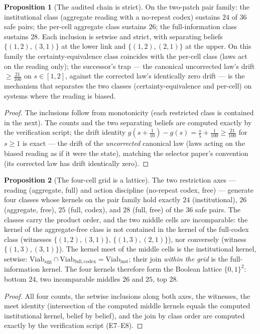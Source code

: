 \documentclass[10pt,twocolumn]{article}
\theoremstyle{definition}
\newtheorem{proposition}{Proposition}
\begin{document}
\begin{proposition}[The audited chain is strict]
\label{prop:chain}
On the two-patch pair family: the institutional class (aggregate reading
with a no-repeat codex) sustains $24$ of $36$ safe pairs; the per-cell
aggregate class sustains $26$; the full-information class sustains $28$.
Each inclusion is setwise and strict, with separating beliefs
$\{(1,2),(3,1)\}$ at the lower link and $\{(1,2),(2,1)\}$ at the upper.
On this family the certainty-equivalence class coincides with the
per-cell class (laws act on the reading only); the successor's trap ---
the canonical uncorrected law's drift $\ge\tfrac{21}{100}$ on
$s\in[1,2]$, against the corrected law's identically zero drift --- is
the mechanism that separates the two classes (certainty-equivalence and
per-cell) on systems where the reading is biased.
\end{proposition}
\begin{proof}
The inclusions follow from monotonicity (each restricted class is contained
in the next). The counts and the two separating beliefs are computed
exactly by the verification script; the drift identity
$g(s+\tfrac1{10})-g(s)=\tfrac s5+\tfrac1{100}\ge\tfrac{21}{100}$ for
$s\ge1$ is exact --- the drift of the \emph{uncorrected} canonical law
(laws acting on the biased reading as if it were the state), matching the
selector paper's convention (its corrected law has drift identically zero).
\end{proof}

\begin{proposition}[The four-cell grid is a lattice]
\label{prop:grid}
The two restriction axes --- reading (aggregate, full) and action
discipline (no-repeat codex, free) --- generate four classes whose kernels
on the pair family hold exactly $24$ (institutional), $26$ (aggregate,
free), $25$ (full, codex), and $28$ (full, free) of the $36$ safe pairs.
The classes carry the product order, and the two middle cells are
incomparable: the kernel of the aggregate-free class is not contained in
the kernel of the full-codex class (witnesses $\{(1,2),(3,1)\}$,
$\{(1,3),(2,1)\}$), nor conversely (witness $\{(1,3),(3,1)\}$). The
kernel meet of the middle cells is the institutional kernel, setwise:
$\mathrm{Viab}_{\mathrm{agg}}\cap
\mathrm{Viab}_{\mathrm{full,codex}}=
\mathrm{Viab}_{\mathrm{inst}}$; their join \emph{within the grid} is
the full-information kernel. The four kernels therefore form the Boolean
lattice $\{0,1\}^2$: bottom $24$, two incomparable middles $26$ and
$25$, top $28$.
\end{proposition}
\begin{proof}
All four counts, the setwise inclusions along both axes, the witnesses,
the meet identity (intersection of the computed middle kernels equals the
computed institutional kernel, belief by belief), and the join by class
order are computed exactly by the verification script (E7--E8).
\end{proof}
\end{document}
